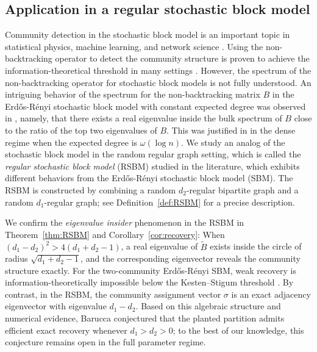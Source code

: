 \documentclass[11pt,reqno]{amsart}
\theoremstyle{definition}
\begin{document}
\subsection{Application in a regular stochastic block model}
Community detection in the stochastic block model is an important topic in statistical physics, machine learning, and network science \cite{abbe2018community}. Using the non-backtracking operator to detect the community structure is proven to achieve the information-theoretical threshold in many settings \cite{bordenave2018nonbacktracking,stephan2022sparse}. However, the spectrum of the non-backtracking operator for stochastic block models is not fully understood. An intriguing behavior of the {spectrum} for the non-backtracking matrix $B$ in the Erd\H{o}s-R\'{e}nyi stochastic block model with constant expected degree was observed in \cite{dall2019revisiting}, {namely}, that there exists a real eigenvalue inside the bulk spectrum of $B$ close to the ratio of the top two eigenvalues of $B$. This was justified in \cite{coste2021eigenvalues} in the dense regime when the expected degree is $\omega(\log n)$. We study an analog of the stochastic block model in the random regular graph setting, which is called the \textit{regular stochastic block model}  (RSBM) \cite{brito2016recovery,barucca2017spectral,newman2014equitable} studied in the literature, which exhibits different behaviors from the Erd\H{o}s-R\'{e}nyi {stochastic block model} (SBM).  The RSBM is constructed by combining a random $d_2$-regular bipartite graph and a random  $d_1$-regular graph; see Definition~\ref{def:RSBM} for a precise description.


We confirm the \textit{eigenvalue insider} phenomenon in the RSBM in Theorem~\ref{thm:RSBM} and Corollary~\ref{cor:recovery}: When $(d_1-d_2)^2>4(d_1+d_2-1)$, a real eigenvalue of $\tilde B$ exists inside the circle of radius $\sqrt{d_1+d_2-1}$, and the corresponding eigenvector reveals the community structure exactly. {For the  two-community Erd\H{o}s-R\'{e}nyi SBM, weak recovery is information-theoretically impossible below the Kesten--Stigum threshold \cite{mossel2015reconstruction}. By contrast, in the RSBM, the community assignment vector $\sigma$ is an exact adjacency eigenvector with eigenvalue $d_1-d_2$. Based on this algebraic structure and numerical evidence, Barucca
\cite{barucca2017spectral} conjectured that the planted partition admits efficient exact recovery whenever $d_1>d_2>0$; to the best of our knowledge, this conjecture remains open in the full parameter regime. 
}
\end{document}
